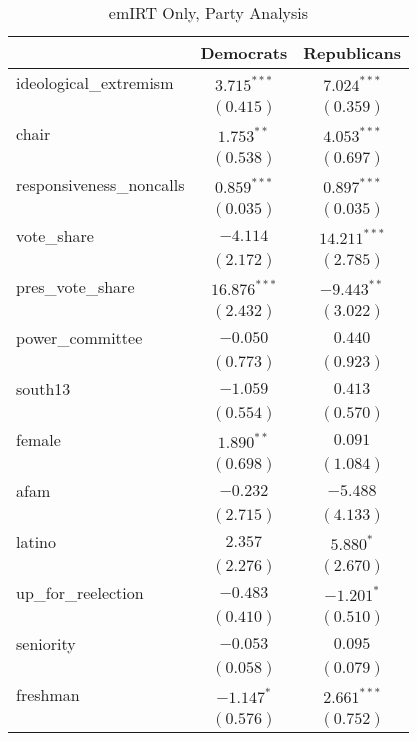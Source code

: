 \documentclass[12pt]{article}
\begin{document}
\begin{table}
	\begin{center}
    	\caption{emIRT Only, Party Analysis}
		\begin{tabular}{l c c }
			\hline
			& Democrats & Republicans \\
			\hline
ideological\_extremism   & $3.715^{***}$  & $7.024^{***}$  \\
& $(0.415)$      & $(0.359)$      \\
chair                    & $1.753^{**}$   & $4.053^{***}$  \\
& $(0.538)$      & $(0.697)$      \\
responsiveness\_noncalls & $0.859^{***}$  & $0.897^{***}$  \\
& $(0.035)$      & $(0.035)$      \\
vote\_share              & $-4.114$       & $14.211^{***}$ \\
& $(2.172)$      & $(2.785)$      \\
pres\_vote\_share        & $16.876^{***}$ & $-9.443^{**}$  \\
& $(2.432)$      & $(3.022)$      \\
power\_committee         & $-0.050$       & $0.440$        \\
& $(0.773)$      & $(0.923)$      \\
south13                  & $-1.059$       & $0.413$        \\
& $(0.554)$      & $(0.570)$      \\
female                   & $1.890^{**}$   & $0.091$        \\
& $(0.698)$      & $(1.084)$      \\
afam                     & $-0.232$       & $-5.488$       \\
& $(2.715)$      & $(4.133)$      \\
latino                   & $2.357$        & $5.880^{*}$    \\
& $(2.276)$      & $(2.670)$      \\
up\_for\_reelection      & $-0.483$       & $-1.201^{*}$   \\
& $(0.410)$      & $(0.510)$      \\
seniority                & $-0.053$       & $0.095$        \\
& $(0.058)$      & $(0.079)$      \\
freshman                 & $-1.147^{*}$   & $2.661^{***}$  \\
& $(0.576)$      & $(0.752)$      \\

\end{tabular}
\end{center}
\end{table}
\end{document}

